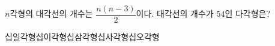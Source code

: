 $n$각형의 대각선의 개수는 $\dfrac{n(n-3)}{2}$이다. 대각선의 개수가 $54$인 다각형은?
\begin{choices32}{십일각형}{십이각형}{십삼각형}{십사각형}{십오각형}\end{choices32}
